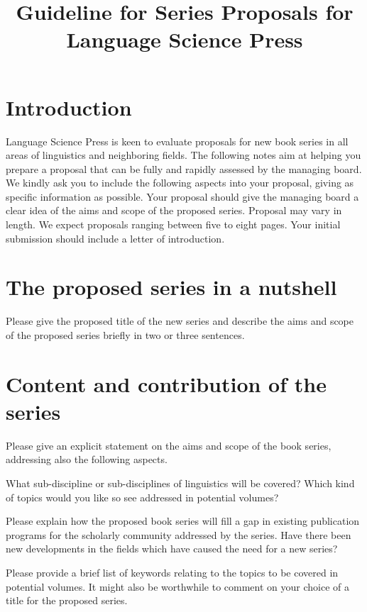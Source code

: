 \documentclass{article}
\title{Guideline for Series Proposals for Language Science Press}
\begin{document}
\maketitle


\section{Introduction}

Language Science Press is keen to evaluate proposals for new book series in all areas
of linguistics and neighboring fields. The following notes aim at
helping you prepare a proposal that can be fully and rapidly assessed
by the managing board. We kindly ask you to include the following
aspects into your proposal, giving as specific information as possible.
Your proposal should give the managing board a clear idea of the aims
and scope of the proposed series. Proposal may vary in length. We
expect proposals ranging between five to eight pages. Your initial
submission should include a letter of introduction.


\section{The proposed series in a nutshell}

Please give the proposed title of the new series and describe the
aims and scope of the proposed series briefly in two or three sentences.


\section{Content and contribution of the series}

Please give an explicit statement on the aims and scope of the book
series, addressing also the following aspects.

What sub-discipline or sub-disciplines of linguistics will be covered?
Which kind of topics would you like so see addressed in potential
volumes?

Please explain how the proposed book series will fill a gap in existing
publication programs for the scholarly community addressed by the
series. Have there been new developments in the fields which have
caused the need for a new series?

Please provide a brief list of keywords relating to the topics to
be covered in potential volumes. It might also be worthwhile to comment
on your choice of a title for the proposed series.
\end{document}
